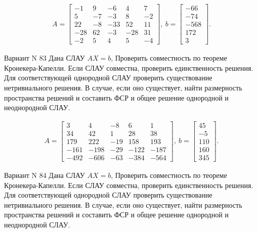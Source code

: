 \documentclass[11pt]{report}
\begin{document}
\begin{align*}
 A = \left[\begin{matrix}-1 & 9 & -6 & 4 & 7\\5 & -7 & -3 & 8 & -2\\22 & -8 & -33 & 52 & 11\\-28 & 62 & -3 & -28 & 31\\-2 & 5 & 4 & 5 & -4\end{matrix}\right],
\ b = \left[\begin{matrix}-66\\-74\\-568\\172\\3\end{matrix}\right]. 
 \end{align*}

Вариант N 83
Дана СЛАУ $AX = b$,
Проверить совместность по теореме Кронекера-Капелли. Если СЛАУ совместна, проверить единственность решения.
Для соответствующей однородной СЛАУ проверить существование нетривиального решения. В случае, если оно существует,
найти размерность пространства решений и составить ФСР и общее решение однородной  и неоднородной СЛАУ.


\begin{align*}
 A = \left[\begin{matrix}3 & 4 & -8 & 6 & 1\\34 & 42 & 1 & 28 & 38\\179 & 222 & -19 & 158 & 193\\-161 & -198 & -29 & -122 & -187\\-492 & -606 & -63 & -384 & -564\end{matrix}\right],
\ b = \left[\begin{matrix}45\\-5\\110\\160\\345\end{matrix}\right]. 
 \end{align*}

Вариант N 84
Дана СЛАУ $AX = b$,
Проверить совместность по теореме Кронекера-Капелли. Если СЛАУ совместна, проверить единственность решения.
Для соответствующей однородной СЛАУ проверить существование нетривиального решения. В случае, если оно существует,
найти размерность пространства решений и составить ФСР и общее решение однородной  и неоднородной СЛАУ.
\end{document}
